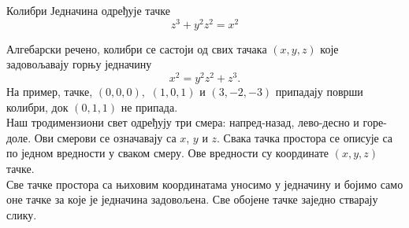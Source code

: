 \begin{surferPage}{Колибри}
Једначина одређује тачке\\
  
  \smallskip
\[z^3+ y^2	z^2	= x^2\]

\singlespacing
Алгебарски речено, колибри се састоји од свих тачака  $(x, y, z)$ које задовољавају горњу једначину
\smallskip
\[ x^2= y^2z^2+z^3.\]
\smallskip
На пример, тачке, $(0,0,0),$ $(1,0,1)$ и $(3,-2,-3)$ припадају површи колибри, док $(0,1,1)$ не припада.\\
 \singlespacing
 Наш тродимензиони свет одређују три смера: напред-назад, лево-десно и горе-доле. Ови смерови се означавају са $x$, $y$ и $z$. Свака тачка простора се описује са по једном вредности у сваком смеру. Ове вредности су координате $(x,y,z)$ тачке.\\
\singlespacing
Све тачке простора са њиховим координатама  уносимо у једначину и бојимо само оне тачке за које је једначина задовољена. Све обојене тачке заједно стварају слику.
\end{surferPage}
